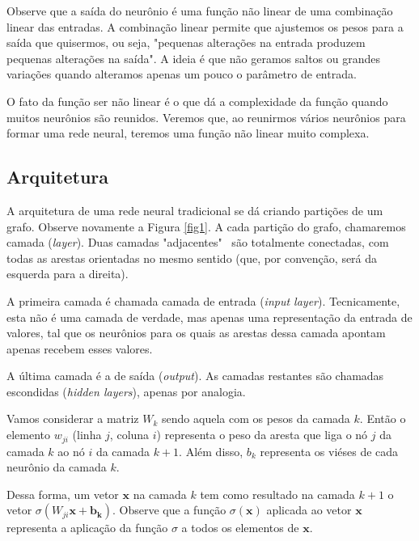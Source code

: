 \documentclass{article}
\begin{document}
            Observe que a saída do neurônio é uma função não linear de uma combinação linear das entradas.
            A combinação linear permite que ajustemos os pesos para a saída que quisermos, ou seja, "pequenas alterações na entrada produzem pequenas alterações na saída".
            A ideia é que não geramos saltos ou grandes variações quando alteramos apenas um pouco o parâmetro de entrada.
            
            O fato da função ser não linear é o que dá a complexidade da função quando muitos neurônios são reunidos.
            Veremos que, ao reunirmos vários neurônios para formar uma rede neural, teremos uma função não linear muito complexa.

        \subsection{Arquitetura}

            A arquitetura de uma rede neural tradicional se dá criando partições de um grafo.
            Observe novamente a Figura \ref{fig1}.
            A cada partição do grafo, chamaremos camada (\textit{layer}).
            Duas camadas "adjacentes" \ são totalmente conectadas, com todas as arestas orientadas no mesmo sentido (que, por convenção, será da esquerda para a direita).

            A primeira camada é chamada camada de entrada (\textit{input layer}).
            Tecnicamente, esta não é uma camada de verdade, mas apenas uma representação da entrada de valores, tal que os neurônios para os quais as arestas dessa camada apontam apenas recebem esses valores.
            
            A última camada é a de saída (\textit{output}).
            As camadas restantes são chamadas escondidas (\textit{hidden layers}), apenas por analogia.

            Vamos considerar a matriz $W_k$ sendo aquela com os pesos da camada $k$.
            Então o elemento $w_{ji}$ (linha $j$, coluna $i$) representa o peso da aresta que liga o nó $j$ da camada $k$ ao nó $i$ da camada $k + 1$.
            Além disso, $b_k$ representa os viéses de cada neurônio da camada $k$.
            
            Dessa forma, um vetor $\mathbf{x}$ na camada $k$ tem como resultado na camada $k + 1$ o vetor $\sigma (W_{ji} \mathbf{x} + \mathbf{b_k})$.
            Observe que a função $\sigma(\mathbf{x})$ aplicada ao vetor $\mathbf{x}$ representa a aplicação da função $\sigma$ a todos os elementos de $\mathbf{x}$.
\end{document}
